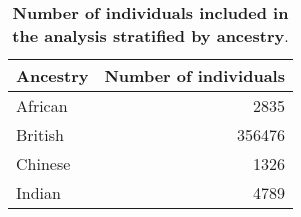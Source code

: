 \begin{table}[ht]
\centering
\begingroup\scriptsize
\begin{tabular}{lr}
  \toprule
{\textbf{Ancestry}} & {\textbf{Number of individuals}} \\ 
  \midrule
African &    2835 \\ 
  British &  356476 \\ 
  Chinese &    1326 \\ 
  Indian &    4789 \\ 
   \bottomrule
\end{tabular}
\endgroup
\caption{\textbf{Number of individuals included in the analysis stratified by ancestry}.} 
\label{tab:indiv_table}
\end{table}

